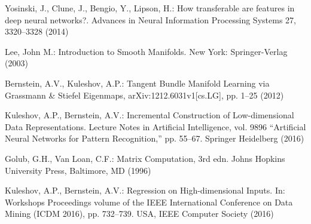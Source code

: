 \documentclass[conference]{IEEEtran} %
\begin{document}
\begin{thebibliography}{100}
Yosinski, J., Clune, J., Bengio, Y., Lipson, H.: How transferable are features in deep neural networks?.
Advances in Neural Information Processing Systems 27,
3320--3328 (2014)


Lee, John M.: Introduction to Smooth Manifolds. New York: Springer-Verlag (2003)

Bernstein, A.V., Kuleshov, A.P.: Tangent Bundle Manifold Learning via Grassmann \& Stiefel Eigenmaps, arXiv:1212.6031v1[cs.LG], pp. 1–25 (2012)

Kuleshov, A.P., Bernstein, A.V.: Incremental Construction of Low-dimensional Data Representations. Lecture Notes in Artificial Intelligence, vol. 9896 ``Artificial Neural Networks for Pattern Recognition,'' pp. 55--67. Springer Heidelberg (2016)

Golub, G.H., Van Loan, C.F.: Matrix Computation, 3rd edn. Johns Hopkins University Press, Baltimore, MD (1996)

Kuleshov, A.P., Bernstein, A.V.: Regression on High-dimensional Inputs. In: Workshops Proceedings volume of the IEEE International Conference on Data Mining (ICDM 2016), pp. 732--739. USA, IEEE Computer Society (2016)



\end{thebibliography}
\end{document}
